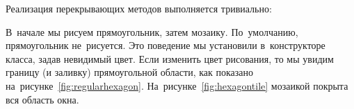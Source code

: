 Реализация перекрывающих методов выполняется тривиально:


В~начале мы рисуем прямоугольник, затем мозаику. По~умолчанию, прямоугольник не~рисуется. Это поведение мы установили в~конструкторе класса, задав невидимый цвет. Если изменить цвет рисования, то мы увидим границу (и заливку) прямоугольной области, как показано на~рисунке~\ref{fig:regularhexagon}. На~рисунке~\ref{fig:hexagontile} мозаикой покрыта вся область окна.
